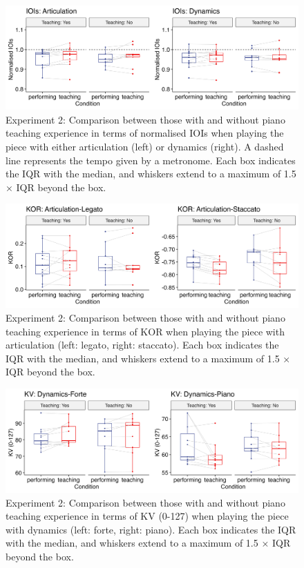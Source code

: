 \documentclass[
  man,floatsintext]{apa6}
\begin{document}
\begin{figure}
\includegraphics[width=1\linewidth]{manuscript_files/figure-latex/plot-ioi-teaching-2-1} \caption{\label{fig:ioi-teaching-2}Experiment 2: Comparison between those with and without piano teaching experience in terms of normalised IOIs when playing the piece with either articulation (left) or dynamics (right). A dashed line represents the tempo given by a metronome. Each box indicates the IQR with the median, and whiskers extend to a maximum of 1.5 × IQR beyond the box.}\label{fig:plot-ioi-teaching-2}
\end{figure}

\begin{figure}
\includegraphics[width=1\linewidth]{manuscript_files/figure-latex/plot-art-teaching-2-1} \caption{\label{fig:art-teaching-2}Experiment 2:  Comparison between those with and without piano teaching experience in terms of KOR when playing the piece with articulation (left: legato, right: staccato). Each box indicates the IQR with the median, and whiskers extend to a maximum of 1.5 × IQR beyond the box.}\label{fig:plot-art-teaching-2}
\end{figure}

\begin{figure}
\includegraphics[width=1\linewidth]{manuscript_files/figure-latex/plot-dyn-teaching-2-1} \caption{\label{fig:dyn-teaching-2}Experiment 2: Comparison between those with and without piano teaching experience in terms of KV (0-127) when playing the piece with dynamics  (left: forte, right: piano). Each box indicates the IQR with the median, and whiskers extend to a maximum of 1.5 × IQR beyond the box.}\label{fig:plot-dyn-teaching-2}
\end{figure}
\end{document}
